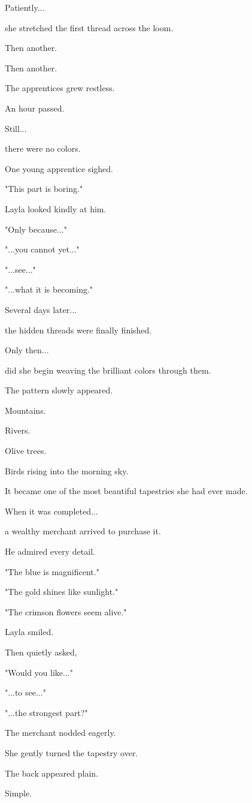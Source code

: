\documentclass[12pt,openany]{book}
\begin{document}
Patiently...

she stretched the first thread across the loom.

Then another.

Then another.

The apprentices grew restless.

An hour passed.

Still...

there were no colors.

One young apprentice sighed.

"This part is boring."

Layla looked kindly at him.

"Only because..."

"...you cannot yet..."

"...see..."

"...what it is becoming."

Several days later...

the hidden threads were finally finished.

Only then...

did she begin weaving the brilliant colors through them.

The pattern slowly appeared.

Mountains.

Rivers.

Olive trees.

Birds rising into the morning sky.

It became one of the most beautiful tapestries she had ever made.

When it was completed...

a wealthy merchant arrived to purchase it.

He admired every detail.

"The blue is magnificent."

"The gold shines like sunlight."

"The crimson flowers seem alive."

Layla smiled.

Then quietly asked,

"Would you like..."

"...to see..."

"...the strongest part?"

The merchant nodded eagerly.

She gently turned the tapestry over.

The back appeared plain.

Simple.
\end{document}
